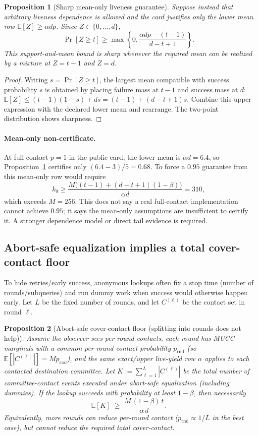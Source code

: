 \documentclass[11pt]{article}
\newtheorem{proposition}{Proposition}
\newcommand{\E}{\mathbb{E}}
\begin{document}
\begin{proposition}[Sharp mean-only liveness guarantee]
\label{prop:mucc-mean-only-liveness}
Suppose instead that arbitrary liveness dependence is allowed and the card justifies only the lower mean row $\E[Z]\ge\alpha dp$.  Since $Z\in\{0,\ldots,d\}$,
\[
 \Pr[Z\ge t]
 \ge
 \max\!\left\{0,\frac{\alpha dp-(t-1)}{d-t+1}\right\}.
\]
This support-and-mean bound is sharp whenever the required mean can be realized by a mixture at $Z=t-1$ and $Z=d$.
\end{proposition}

\begin{proof}
Writing $s=\Pr[Z\ge t]$, the largest mean compatible with success probability $s$ is obtained by placing failure mass at $t-1$ and success mass at $d$:
$\E[Z]\le(t-1)(1-s)+ds=(t-1)+(d-t+1)s$.
Combine this upper expression with the declared lower mean and rearrange.  The two-point distribution shows sharpness.
\end{proof}

\paragraph{Mean-only non-certificate.}
At full contact $p=1$ in the public card, the lower mean is $\alpha d=6.4$, so Proposition~\ref{prop:mucc-mean-only-liveness} certifies only $(6.4-3)/5=0.68$.  To force a $0.95$ guarantee from this mean-only row would require
\[
 k_0\ge \frac{M\bigl((t-1)+(d-t+1)(1-\beta)\bigr)}{\alpha d}=310,
\]
which exceeds $M=256$.  This does not say a real full-contact implementation cannot achieve $0.95$; it says the mean-only assumptions are insufficient to certify it.  A stronger dependence model or direct tail evidence is required.

\subsection{Abort-safe equalization implies a total cover-contact floor}
To hide retries/early success, anonymous lookups often fix a stop time (number of rounds/subqueries) and run dummy work when success would otherwise happen early.
Let $L$ be the fixed number of rounds, and let $C^{(\ell)}$ be the contact set in round $\ell$.

\begin{proposition}[Abort-safe cover-contact floor (splitting into rounds does not help)]
\label{prop:mucc-stop-time-floor}
Assume the observer sees per-round contacts, each round has MUCC marginals with a common per-round contact probability $p_{\mathrm{rnd}}$ (so $\E[|C^{(\ell)}|]=Mp_{\mathrm{rnd}}$), and the same exact/upper live-yield row $\alpha$ applies to each contacted destination committee.
Let $K:=\sum_{\ell=1}^L |C^{(\ell)}|$ be the total number of committee-contact events executed under abort-safe equalization (including dummies).
If the lookup succeeds with probability at least $1-\beta$, then necessarily
\[
\E[K] \;\ge\; \frac{M\,(1-\beta)\,t}{\alpha\,d}.
\]
Equivalently, more rounds can reduce per-round contact ($p_{\mathrm{rnd}}\propto 1/L$ in the best case), but cannot reduce the required \emph{total} cover-contact.
\end{proposition}
\end{document}
